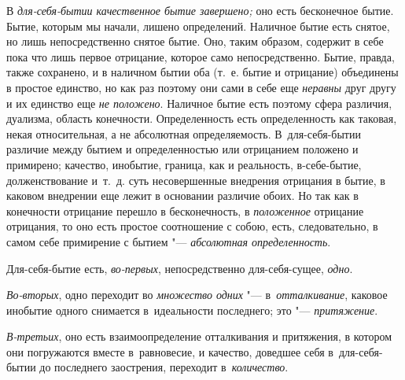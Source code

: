 В {\em для-себя-бытии качественное бытие завершено;} оно
есть бесконечное бытие. Бытие, которым мы начали, лишено определений.
Наличное бытие есть снятое, но лишь непосредственно снятое бытие. Оно,
таким образом, содержит в себе пока что лишь первое отрицание, которое само
непосредственно. Бытие, правда, также сохранено, и в наличном бытии оба
(т.~е. бытие и отрицание) объединены в простое единство, но как раз поэтому
они сами в себе еще {\em неравны} друг другу и их
единство еще {\em не положено}. Наличное бытие есть
поэтому сфера различия, дуализма, область конечности. Определенность
есть определенность как таковая, некая относительная, а не абсолютная
определяемость. В~для-себя-бытии различие между бытием и определенностью
или отрицанием положено и примирено; качество, инобытие, граница, как и
реальность, в-себе-бытие, долженствование и~т.~д. суть несовершенные
внедрения отрицания в бытие, в каковом внедрении еще лежит в основании
различие обоих. Но так как в конечности отрицание перешло в бесконечность,
в {\em положенное} отрицание отрицания, то оно есть
простое соотношение с собою, есть, следовательно, в самом себе примирение с
бытием "--- {\em абсолютная определенность}.

Для-себя-бытие есть, {\em во-первых}, непосредственно
для-себя-сущее, {\em одно}.

{\em Во-вторых}, одно переходит во {\em множество одних} "---
в~{\em отталкивание}, каковое инобытие одного снимается
в~идеальности последнего; это "--- {\em притяжение}.

{\em В-третьих}, оно есть взаимоопределение отталкивания и притяжения,
в котором они погружаются вместе в~равновесие, и качество, доведшее себя
в~для-себя-бытии до последнего заострения, переходит в~{\em количество}.


